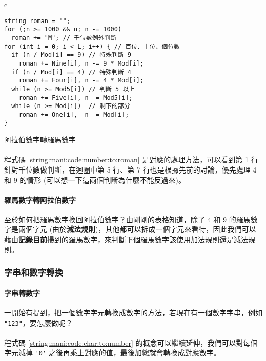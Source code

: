 \documentclass[12pt,a4paper,oneside]{article}
\begin{document}
\begin{CJK}{UTF8}{bkai}
\begin{code}[h!]
  \centering
  \begin{tabular}{c}
  \begin{lstlisting}
string roman = "";
for (;n >= 1000 && n; n -= 1000)
  roman += "M"; // 千位數例外判斷
for (int i = 0; i < L; i++) { // 百位、十位、個位數
  if (n / Mod[i] == 9) // 特殊判斷 9
    roman += Nine[i], n -= 9 * Mod[i];
  if (n / Mod[i] == 4) // 特殊判斷 4
    roman += Four[i], n -= 4 * Mod[i];
  while (n >= Mod5[i]) // 判斷 5 以上
    roman += Five[i], n -= Mod5[i];
  while (n >= Mod[i])  // 剩下的部分
    roman += One[i],  n -= Mod[i];
}
  \end{lstlisting}
  \end{tabular}
  \caption{阿拉伯數字轉羅馬數字}
  \label{string:mani:code:number:to:roman}
\end{code}

\paragraph{}程式碼 \ref{string:mani:code:number:to:roman} 是對應的處理方法，可以看到第 1 行針對千位數做判斷，在迴圈中第 5 行、第 7 行也是根據先前的討論，優先處理 4 和 9 的情形 (可以想一下這兩個判斷為什麼不能反過來)。

\paragraph{羅馬數字轉阿拉伯數字}至於如何把羅馬數字換回阿拉伯數字？由剛剛的表格知道，除了 4 和 9 的羅馬數字是兩個字元 (由於\textbf{減法規則})，其他都可以拆成一個字元來看待，因此我們可以藉由{\color{red}\textbf{記錄目前}}掃到的羅馬數字，來判斷下個羅馬數字該使用加法規則還是減法規則。

\subsubsection{字串和數字轉換}

\paragraph{字串轉數字}一開始有提到，把一個數字字元轉換成數字的方法，若現在有一個數字字串，例如 \lstinline!"123"!，要怎麼做呢？

\paragraph{}程式碼 \ref{string:mani:code:char:to:number} 的概念可以繼續延伸，我們可以對每個字元減掉 \lstinline!'0'! 之後再乘上對應的值，最後加總就會轉換成對應數字。


\end{CJK}
\end{document}
